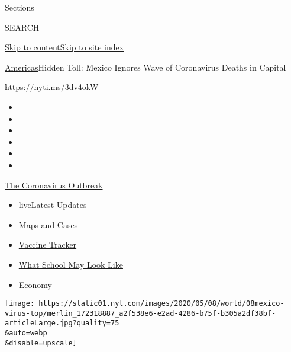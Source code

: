 Sections

SEARCH

\protect\hyperlink{site-content}{Skip to
content}\protect\hyperlink{site-index}{Skip to site index}

\href{/section/world/americas}{Americas}\textbar{}Hidden Toll: Mexico
Ignores Wave of Coronavirus Deaths in Capital

\url{https://nyti.ms/3dv4okW}

\begin{itemize}
\item
\item
\item
\item
\item
\item
\end{itemize}

\href{https://www.nytimes.com/news-event/coronavirus?action=click\&pgtype=Article\&state=default\&region=TOP_BANNER\&context=storylines_menu}{The
Coronavirus Outbreak}

\begin{itemize}
\tightlist
\item
  live\href{https://www.nytimes.com/2020/08/01/world/coronavirus-covid-19.html?action=click\&pgtype=Article\&state=default\&region=TOP_BANNER\&context=storylines_menu}{Latest
  Updates}
\item
  \href{https://www.nytimes.com/interactive/2020/us/coronavirus-us-cases.html?action=click\&pgtype=Article\&state=default\&region=TOP_BANNER\&context=storylines_menu}{Maps
  and Cases}
\item
  \href{https://www.nytimes.com/interactive/2020/science/coronavirus-vaccine-tracker.html?action=click\&pgtype=Article\&state=default\&region=TOP_BANNER\&context=storylines_menu}{Vaccine
  Tracker}
\item
  \href{https://www.nytimes.com/interactive/2020/07/29/us/schools-reopening-coronavirus.html?action=click\&pgtype=Article\&state=default\&region=TOP_BANNER\&context=storylines_menu}{What
  School May Look Like}
\item
  \href{https://www.nytimes.com/live/2020/07/31/business/stock-market-today-coronavirus?action=click\&pgtype=Article\&state=default\&region=TOP_BANNER\&context=storylines_menu}{Economy}
\end{itemize}

\texttt{[image: https://static01.nyt.com/images/2020/05/08/world/08mexico-virus-top/merlin\_172318887\_a2f538e6-e2ad-4286-b75f-b305a2df38bf-articleLarge.jpg?quality=75\\\&auto=webp\\\&disable=upscale]}

